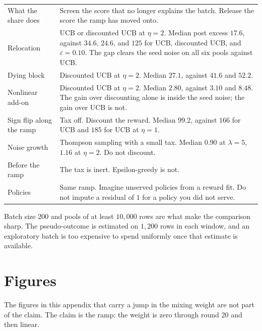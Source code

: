 \documentclass[11pt]{article}
\begin{document}
\begin{center}
\begin{tabular}{p{}p{}}
\toprule
What the share does & Screen the score that no longer explains the batch. Release the score the ramp has moved onto. \\
Relocation & UCB or discounted UCB at \(\eta=2\). Median post excess \(17.6\), against \(34.6\), \(24.6\), and \(125\) for UCB, discounted UCB, and \(\varepsilon=0.10\). The gap clears the seed noise on all six pools against UCB. \\
Dying block & Discounted UCB at \(\eta=2\). Median \(27.1\), against \(41.6\) and \(52.2\). \\
Nonlinear add-on & Discounted UCB at \(\eta=2\). Median \(2.80\), against \(3.10\) and \(8.48\). The gain over discounting alone is inside the seed noise; the gain over UCB is not. \\
Sign flip along the ramp & Tax off. Discount the reward. Median \(99.2\), against \(166\) for UCB and \(185\) for UCB at \(\eta=1\). \\
Noise growth & Thompson sampling with a small tax. Median \(0.90\) at \(\lambda=5\), \(1.16\) at \(\eta=2\). Do not discount. \\
Before the ramp & The tax is inert. Epsilon-greedy is not. \\
Policies & Same ramp. Imagine unserved policies from a reward fit. Do not impute a residual of \(1\) for a policy you did not serve. \\
\bottomrule
\end{tabular}
\end{center}

Batch size \(200\) and pools of at least \(10{,}000\) rows are what make the comparison sharp.
The pseudo-outcome is estimated on \(1{,}200\) rows in each window, and an exploratory batch is too expensive to spend uniformly once that estimate is available.

\appendix
\section{Figures}
\graphicspath{{figures/}}

The figures in this appendix that carry a jump in the mixing weight are not part of the claim.
The claim is the ramp: the weight is zero through round 20 and then linear.
\end{document}
